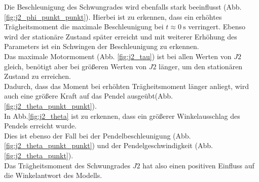 Die Beschleunigung des Schwungrades wird ebenfalls stark beeinflusst (Abb. \ref{fig:j2_phi_punkt_punkt}).
Hierbei ist zu erkennen, dass ein erhöhtes Trägheitsmoment die maximale Beschleunigung bei $t\approx\SI{0}{\s}$ verringert. 
Ebenso wird der stationäre Zustand später erreicht und mit weiterer Erhöhung des Parameters ist ein Schwingen der Beschleunigung zu erkennen.\\
   
Das maximale Motormoment (Abb. \ref{fig:j2_tau}) ist bei allen Werten von $J2$ gleich, benötigt aber bei größeren Werten von $J2$ länger, um den stationären Zustand zu erreichen.\\
Dadurch, dass das Moment bei erhöhten Trägheitsmoment länger anliegt, wird auch eine größere Kraft auf das Pendel ausgeübt(Abb. \ref{fig:j2_theta_punkt_punkt}).\\
In Abb.\ref{fig:j2_theta} ist zu erkennen, dass ein größerer Winkelausschlag des Pendels erreicht wurde.\\
Dies ist ebenso der Fall bei der Pendelbeschleunigung (Abb. \ref{fig:j2_theta_punkt_punkt}) und der Pendelgeschwindigkeit (Abb. \ref{fig:j2_theta_punkt}).\\

 Das Trägheitsmoment des Schwungrades $J2$ hat also einen positiven Einfluss auf die Winkelantwort des Modells.\\  
 
